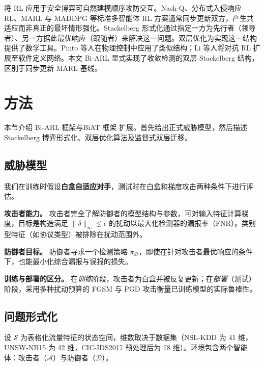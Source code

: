 \documentclass[12pt,a4paper]{ctexart}
\begin{document}
将 RL 应用于安全博弈可自然建模顺序攻防交互\cite{anderson2016rl_security}。Nash-Q、分布式入侵响应 RL、MARL 与 MADDPG 等标准多智能体 RL 方案通常同步更新双方，产生共适应而非真正的最坏情形强化\cite{hu2003nashq,malialis2015multiagent,busoniu2008marl,lowe2017maddpg}。Stackelberg 形式化通过指定一方为先行者（领导者）、另一方据此最优响应（跟随者）来解决这一问题\cite{vonStackelberg1952,colson2007bilevel,sinha2018bilevel,bard1998bilevel}。双层优化为实现这一结构提供了数学工具。Pinto 等人在物理控制中应用了类似结构\cite{pinto2017robust_rl}；Li 等人将对抗 RL 扩展至软件定义网络\cite{li2022advrl_security}。本文 Bi-ARL 显式实现了收敛检测的双层 Stackelberg 结构，区别于同步更新 MARL 基线。

\section{方法}

本节介绍 Bi-ARL 框架与BiAT 框架 扩展。首先给出正式威胁模型，然后描述 Stackelberg 博弈形式化、双层优化算法及监督式双层迁移。

\subsection{威胁模型}
\label{sec:threatmodel_cn}

我们在训练时假设\textbf{白盒自适应对手}，测试时在白盒和梯度攻击两种条件下进行评估。

\textbf{攻击者能力。} 攻击者完全了解防御者的模型结构与参数，可对输入特征计算梯度，目标是构造满足 $\|\delta\|_\infty \leq \epsilon$ 的扰动以最大化检测器的漏报率（FNR）。类别型特征（如协议类型）被排除在扰动范围外。

\textbf{防御者目标。} 防御者寻求一个检测策略 $\pi_{\mathcal{D}}$，即使在针对攻击者最优响应的条件下，也能最小化综合漏报与误报的损失。

\textbf{训练与部署的区分。} 在\emph{训练}阶段，攻击者为白盒并被反复更新；在\emph{部署}（测试）阶段，采用多种扰动预算的 FGSM 与 PGD 攻击衡量已训练模型的实际鲁棒性。

\subsection{问题形式化}

设 $\mathcal{S}$ 为表格化流量特征的状态空间，维数取决于数据集（NSL-KDD 为 41 维，UNSW-NB15 为 42 维，CIC-IDS2017 预处理后为 78 维）。环境包含两个智能体：攻击者（$\mathcal{A}$）与防御者（$\mathcal{D}$）。
\end{document}
